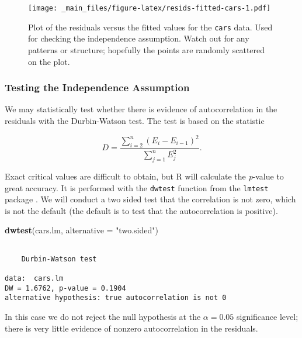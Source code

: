 \documentclass[]{book}
\newenvironment{Shaded}{\begin{snugshade}}{\end{snugshade}}
\newcommand{\KeywordTok}[1]{\textcolor[rgb]{0.13,0.29,0.53}{\textbf{{#1}}}}
\newcommand{\DataTypeTok}[1]{\textcolor[rgb]{0.13,0.29,0.53}{{#1}}}
\newcommand{\StringTok}[1]{\textcolor[rgb]{0.31,0.60,0.02}{{#1}}}
\newcommand{\NormalTok}[1]{{#1}}
\numberwithin{equation}{chapter}
\numberwithin{figure}{chapter}
\theoremstyle{plain}
\theoremstyle{definition}
\theoremstyle{remark}
\theoremstyle{definition}
\theoremstyle{definition}
\theoremstyle{remark}
\begin{document}
\begin{figure}[htbp]
\centering
\texttt{[image: \_main\_files/figure-latex/resids-fitted-cars-1.pdf]}
\caption{\label{fig:resids-fitted-cars}\small Plot of the residuals versus the
fitted values for the \texttt{cars} data. Used for checking the
independence assumption. Watch out for any patterns or structure;
hopefully the points are randomly scattered on the plot.}
\end{figure}






\subsubsection{Testing the Independence
Assumption}\label{testing-the-independence-assumption}

We may statistically test whether there is evidence of autocorrelation
in the residuals with the Durbin-Watson test. The test is based on the
statistic

\begin{equation}
D=\frac{\sum_{i=2}^{n}(E_{i}-E_{i-1})^{2}}{\sum_{j=1}^{n}E_{j}^{2}}.
\end{equation}

Exact critical values are difficult to obtain, but R will calculate the
\emph{p}-value to great accuracy. It is performed with the
\texttt{dwtest} function from the \texttt{lmtest} package
\autocite{lmtest}. We will conduct a two sided test that the correlation
is not zero, which is not the default (the default is to test that the
autocorrelation is positive).

\begin{Shaded}
\begin{Highlighting}[]
\KeywordTok{dwtest}\NormalTok{(cars.lm, }\DataTypeTok{alternative =} \StringTok{"two.sided"}\NormalTok{)}
\end{Highlighting}
\end{Shaded}

\begin{verbatim}

    Durbin-Watson test

data:  cars.lm
DW = 1.6762, p-value = 0.1904
alternative hypothesis: true autocorrelation is not 0
\end{verbatim}

In this case we do not reject the null hypothesis at the \(\alpha=0.05\)
significance level; there is very little evidence of nonzero
autocorrelation in the residuals.
\end{document}
